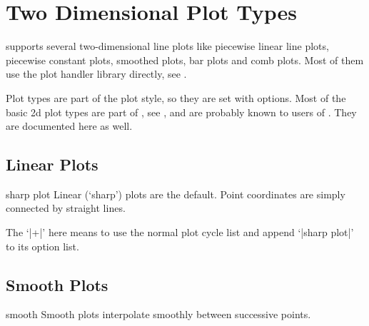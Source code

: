 
\section[reference.2dplots]{Two Dimensional Plot Types}

{%

\PGFPlots{} supports several two-dimensional line plots like piecewise linear
line plots, piecewise constant plots, smoothed plots, bar plots and comb plots.
Most of them use the \PGF{} plot handler library directly, see
\cite[Section~18.8]{tikz}.

Plot types are part of the plot style, so they are set with options. Most of
the basic 2d plot types are part of \Tikz{}, see \cite[Section~18.8]{tikz}, and
are probably known to users of \Tikz{}. They are documented here as well.


\subsection{Linear Plots}

\begin{plottype}{sharp plot}
    Linear (`sharp') plots are the default. Point coordinates are simply
    connected by straight lines.
\begin{codeexample}[]
\end{codeexample}

    The `|+|' here means to use the normal plot cycle list and append
    `|sharp plot|' to its option list.
\end{plottype}


\subsection{Smooth Plots}

\begin{plottype}{smooth}
    Smooth plots interpolate smoothly between successive points.
\begin{codeexample}[]
\end{codeexample}
\end{plottype}

}
